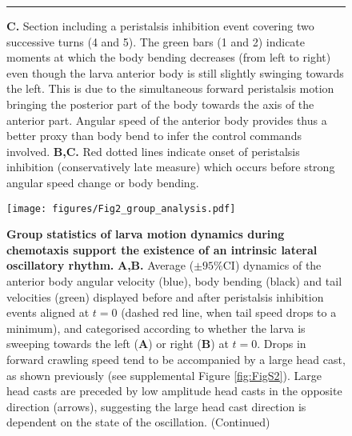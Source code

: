 \documentclass[11pt,a4paper]{article}
\newcommand{\todoBW}[1]{\todo[author=BW,color=orange, size=\tiny,inline]{#1}}
\begin{document}
\begin{figure}
\ContinuedFloat
\caption{
{\bf C.} Section including a peristalsis inhibition event covering two successive turns (4 and 5). The green bars (1 and 2) indicate moments at which the body bending decreases (from left to right) even though the larva anterior body is still slightly swinging towards the left. This is due to the simultaneous forward peristalsis motion bringing the posterior part of the body towards the axis of the anterior part. Angular speed of the anterior body provides thus a better proxy than body bend to infer the control commands involved.
 {\bf B,C.} Red dotted lines indicate onset of peristalsis inhibition (conservatively late measure) which occurs before strong angular speed change or body bending. 
}
\hrule
\end{figure}


\begin{figure}
\begin{center}
\texttt{[image: figures/Fig2\_group\_analysis.pdf]}
\caption{{\bf Group statistics of larva motion dynamics during chemotaxis support the existence of an intrinsic lateral oscillatory rhythm.}
{\bf A,B.} Average ($\pm 95\%$CI) dynamics of the anterior body angular velocity (blue), body bending (black) and tail velocities (green) displayed before and after peristalsis inhibition events aligned at $t=0$ (dashed red line, when tail speed drops to a minimum), and categorised according to whether the larva is sweeping towards the left ({\bf A}) or right ({\bf B}) at $t=0$. Drops in forward crawling speed tend to be accompanied by a large head cast, as shown previously \citep{hernandez2015reverse} (see supplemental Figure \ref{fig:FigS2}). Large head casts are preceded by low amplitude head casts in the opposite direction (arrows), suggesting the large head cast direction is dependent on the state of the oscillation. (Continued)
}
\end{center}
\end{figure}
\end{document}
